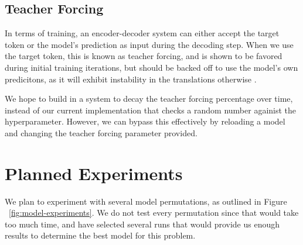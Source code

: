 \documentclass[twoside,twocolumn]{article}
\begin{document}
\subsection{Teacher Forcing}
In terms of training, an encoder-decoder system can either accept the target
token or the model's prediction as input during the decoding step. When we use
the target token, this is known as teacher forcing, and is shown to be favored
during initial training iterations, but should be backed off to use the
model's own predicitons, as it will exhibit instability in the translations
otherwise \cite{lamb2016professor}.

We hope to build in a system to decay the teacher forcing percentage over time,
instead of our current implementation that checks a random number againist the
hyperparameter. However, we can bypass this effectively by reloading a model
and changing the teacher forcing parameter provided.

\section{Planned Experiments}
We plan to experiment with several model permutations, as outlined in Figure
~\ref{fig:model-experiments}. We do not test every permutation since that would
take too much time, and have selected several runs that would provide us enough
results to determine the best model for this problem.
\end{document}
